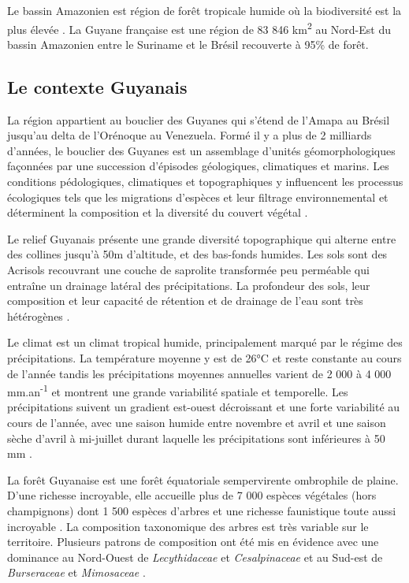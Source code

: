 \documentclass[
  11pt,
  french,
  A4paper,
  extrafontsizes,onecolumn,openright
  ]{memoir}
\begin{document}
Le bassin Amazonien est région de forêt tropicale humide où la
biodiversité est la plus élevée \autocite{Gentry1988}. La Guyane
française est une région de 83 846 km\textsuperscript{2} au Nord-Est du
bassin Amazonien entre le Suriname et le Brésil recouverte à 95\% de
forêt.

\subsection{Le contexte Guyanais}\label{le-contexte-guyanais}

La région appartient au bouclier des Guyanes qui s'étend de l'Amapa au
Brésil jusqu'au delta de l'Orénoque au Venezuela. Formé il y a plus de 2
milliards d'années, le bouclier des Guyanes est un assemblage d'unités
géomorphologiques façonnées par une succession d'épisodes géologiques,
climatiques et marins. Les conditions pédologiques, climatiques et
topographiques y influencent les processus écologiques tels que les
migrations d'espèces et leur filtrage environnemental et déterminent la
composition et la diversité du couvert végétal \autocite{Guitet2015}.

Le relief Guyanais présente une grande diversité topographique qui
alterne entre des collines jusqu'à 50m d'altitude, et des bas-fonds
humides. Les sols sont des Acrisols recouvrant une couche de saprolite
transformée peu perméable qui entraîne un drainage latéral des
précipitations. La profondeur des sols, leur composition et leur
capacité de rétention et de drainage de l'eau sont très hétérogènes
\autocites{Ferry2010}{Robert2003}.

Le climat est un climat tropical humide, principalement marqué par le
régime des précipitations. La température moyenne y est de 26°C et reste
constante au cours de l'année tandis les précipitations moyennes
annuelles varient de 2 000 à 4 000 mm.an\textsuperscript{-1} et montrent
une grande variabilité spatiale et temporelle. Les précipitations
suivent un gradient est-ouest décroissant et une forte variabilité au
cours de l'année, avec une saison humide entre novembre et avril et une
saison sèche d'avril à mi-juillet durant laquelle les précipitations
sont inférieures à 50 mm \autocite{Wagner2011}.

La forêt Guyanaise est une forêt équatoriale sempervirente ombrophile de
plaine. D'une richesse incroyable, elle accueille plus de 7 000 espèces
végétales (hors champignons) dont 1 500 espèces d'arbres et une richesse
faunistique toute aussi incroyable \autocite{DeNoter2008}. La
composition taxonomique des arbres est très variable sur le territoire.
Plusieurs patrons de composition ont été mis en évidence avec une
dominance au Nord-Ouest de \emph{Lecythidaceae} et \emph{Cesalpinaceae}
et au Sud-est de \emph{Burseraceae} et \emph{Mimosaceae}
\autocite{Guitet2015}.
\end{document}
